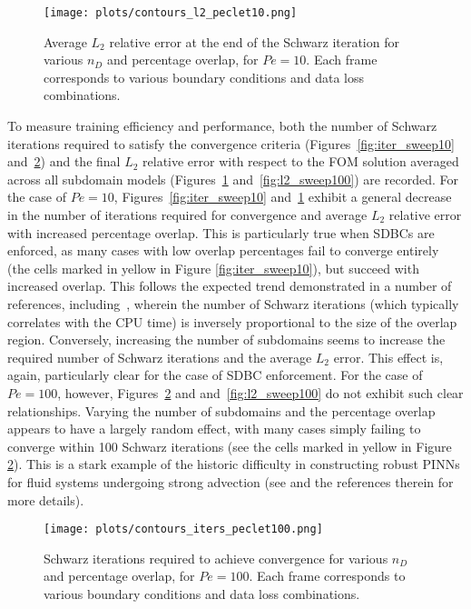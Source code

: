 \documentclass[oneside,final]{csri23}
\begin{document}
\begin{figure}
    \centering
    \texttt{[image: plots/contours\_l2\_peclet10.png]}
    \caption{Average $L_2$ relative error at the end of the Schwarz iteration for various $n_D$ and percentage overlap, for $Pe = 10$. Each frame corresponds to various boundary conditions and data loss combinations.}
    \label{fig:l2_sweep10}
\end{figure}

To measure training efficiency and performance, both the number of Schwarz iterations required to satisfy the convergence criteria (Figures~\ref{fig:iter_sweep10} and~\ref{fig:iter_sweep100}) and the final $L_2$ relative error with respect to the FOM solution averaged across all subdomain models (Figures~\ref{fig:l2_sweep10} and~\ref{fig:l2_sweep100}) are recorded. For the case of $Pe = 10$, Figures~\ref{fig:iter_sweep10} and~\ref{fig:l2_sweep10} exhibit a general decrease in the number of iterations required for convergence and average $L_2$ relative error with increased percentage overlap. This is particularly true when SDBCs are enforced, as many cases with low overlap percentages fail to converge entirely (the cells marked in yellow in Figure \ref{fig:iter_sweep10}), but succeed with increased overlap. This follows the expected trend demonstrated in a number of references, including~\cite{WDS:Lions1988, WDS:mota2017schwarz, WDS:mota2022schwarz, WDS:LiDeepDDM}, wherein the number of Schwarz iterations (which typically correlates with the CPU time) is inversely proportional to the size of the overlap region. Conversely, increasing the number of subdomains seems to increase the required number of Schwarz iterations and the average $L_2$ error. This effect is, again, particularly clear for the case of SDBC enforcement. For the case of $Pe = 100$, however, Figures~\ref{fig:iter_sweep100} and and~\ref{fig:l2_sweep100} do not exhibit such clear relationships. Varying the number of subdomains and the percentage overlap appears to have a largely random effect, with many cases simply failing to converge within 100 Schwarz iterations (see the cells marked in yellow in Figure \ref{fig:iter_sweep100}). This is a stark example of the historic difficulty in constructing robust PINNs for fluid systems undergoing strong advection (see \cite{WDS:Mojgani:2023} and the references therein for more details).

\begin{figure}
    \centering
    \texttt{[image: plots/contours\_iters\_peclet100.png]}
    \caption{Schwarz iterations required to achieve convergence for various $n_D$ and percentage overlap, for $Pe = 100$. Each frame corresponds to various boundary conditions and data loss combinations.}
    \label{fig:iter_sweep100}
\end{figure}
\end{document}
